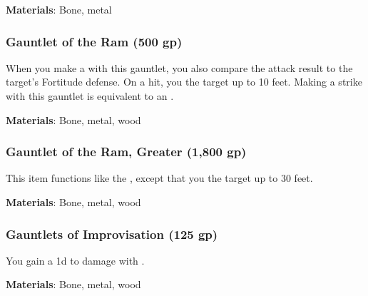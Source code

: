 \vspace{0.25em}
\textbf{Materials}: Bone, metal


\lowercase{\hypertarget{item:Gauntlet of the Ram}{}}\label{item:Gauntlet of the Ram}
\hypertarget{item:Gauntlet of the Ram}{\subsubsection{Gauntlet of the Ram\hfill{} (500 gp)}}

When you make a  with this gauntlet, you also compare the attack result to the target's Fortitude defense.
On a hit, you  the target up to 10 feet.
Making a strike with this gauntlet is equivalent to an .



\vspace{0.25em}
\textbf{Materials}: Bone, metal, wood


\lowercase{\hypertarget{item:Gauntlet of the Ram, Greater}{}}\label{item:Gauntlet of the Ram, Greater}
\hypertarget{item:Gauntlet of the Ram, Greater}{\subsubsection{Gauntlet of the Ram, Greater\hfill{} (1,800 gp)}}

This item functions like the , except that you  the target up to 30 feet.



\vspace{0.25em}
\textbf{Materials}: Bone, metal, wood


\lowercase{\hypertarget{item:Gauntlets of Improvisation}{}}\label{item:Gauntlets of Improvisation}
\hypertarget{item:Gauntlets of Improvisation}{\subsubsection{Gauntlets of Improvisation\hfill{} (125 gp)}}

You gain a \plus1d  to damage with .



\vspace{0.25em}
\textbf{Materials}: Bone, metal, wood


